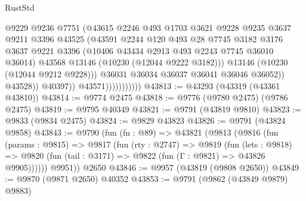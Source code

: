 \begin{lexlean}{RustStd}
\begin{coremodule}
                                      @9229
                                      @9236
                                      @7751
                                      (@43615
                                        @2246
                                        @493
                                        @1703
                                        @3621
                                        @9228
                                        @9235
                                        @3637
                                        @9211
                                        @3396
                                        @43525
                                        (@43591
                                          @2244
                                          @120
                                          @493
                                          @28
                                          @7745
                                          @3182
                                          @3176
                                          @3637
                                          @9221
                                          @3396
                                          (@10406 @43434 @2913 @493 @2243 @7745 @36010 @36014)
                                          @43568
                                          @13146
                                          (@10230 (@12044 @9222 @3182)))
                                        @13146
                                        (@10230 (@12044 @9212 @9228)))
                                      @36031
                                      @36034
                                      @36037
                                      @36041
                                      @36046
                                      @36052))
                                  @43528))
                              @40397))
                          @43571)))))))))))
@43813 := @43293 (@43319 (@43361 @43810))
@43814 := @9774 @2475
@43818 := @9776 (@9780 @2475) (@9786 @2475)
@43819 := @9795 @40349
@43821 := @9791 (@43819 @9810)
@43823 := @9833 (@9834 @2475)
@43824 := @9829 @43823
@43826 := @9791 (@43824 @9858)
@43843 := @9790
    (fun (fn : @89) =>
    @43821
      (@9813
        (@9816
          (fun (params : @9815) =>
          @9817
            (fun (rty : @2747) =>
            @9819
              (fun (lets : @9818) =>
              @9820 (fun (tail : @3171) => @9822 (fun (Γ : @9821) => @43826 @9905))))))
        @9951))
    @2650
@43846 := @9957 (@43819 (@9808 @2650))
@43849 := @9870 (@9871 @2650) @40352
@43853 := @9791 (@9862 (@43849 @9879) @9883)

\end{coremodule}
\end{lexlean}
